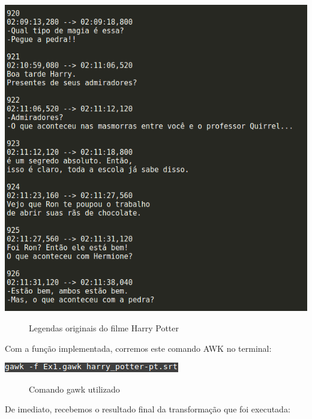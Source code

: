 \documentclass[a4paper]{article}
\begin{document}
\begin{center}
	\includegraphics[scale=0.4]{3}
	\begin{figure}[!h]
	\caption{Legendas originais do filme Harry Potter}
	\end{figure}
\end{center}

Com a função implementada, corremos este comando AWK no terminal:

\begin{center}
	\includegraphics[scale=0.7]{4}
	\begin{figure}[!h]
	\caption{Comando gawk utilizado}
	\end{figure}
\end{center}


\vspace{400px}
De imediato, recebemos o resultado final da transformação que foi executada:
\end{document}
